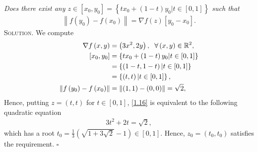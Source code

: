 \documentclass[a4paper]{article}
\numberwithin{equation}{section}
\begin{document}
\textit{Does there exist any $z \in \left[ {x_0,y_0} \right] = \left\{ {tx_0 + \left( {1 - t} \right)y_0|t \in \left[ {0,1} \right]} \right\}$ such that}
\begin{align}
\label{1.16}
\left\| {f\left( {{y_0}} \right) - f\left( {{x_0}} \right)} \right\| = \nabla f\left( z \right)\left[ {{y_0} - {x_0}} \right].
\end{align}
\textsc{Solution.} We compute 
\begin{align}
\nabla f\left( {x,y} \right) &= \left( {3{x^2},2y} \right),\hspace{0.2cm}\forall \left( {x,y} \right) \in {\mathbb{R}^2},\\
\left[ {{x_0},{y_0}} \right] &= \left\{ {t{x_0} + \left( {1 - t} \right){y_0}|t \in \left[ {0,1} \right]} \right\}\\
 &= \left\{ {\left( {1 - t,1 - t} \right)|t \in \left[ {0,1} \right]} \right\}\\
 &= \left\{ {\left( {t,t} \right)|t \in \left[ {0,1} \right]} \right\},\\
\left\| {f\left( {{y_0}} \right) - f\left( {{x_0}} \right)} \right\| &= \left\| {\left( {1,1} \right) - \left( {0,0} \right)} \right\| = \sqrt 2 ,
\end{align}
Hence, putting $z=\left(t,t\right)$ for $t\in \left[0,1\right]$, \eqref{1.16} is equivalent to the following quadratic equation
\begin{align}
3{t^2} + 2t = \sqrt 2 ,
\end{align}
which has a root $t_0 = \frac{1}{3}\left( {\sqrt {1 + 3\sqrt 2 }  - 1} \right) \in \left[ {0,1} \right]$. Hence, $z_0=\left(t_0,t_0\right)$ satisfies the requirement. \hfill $\square$
\end{document}
